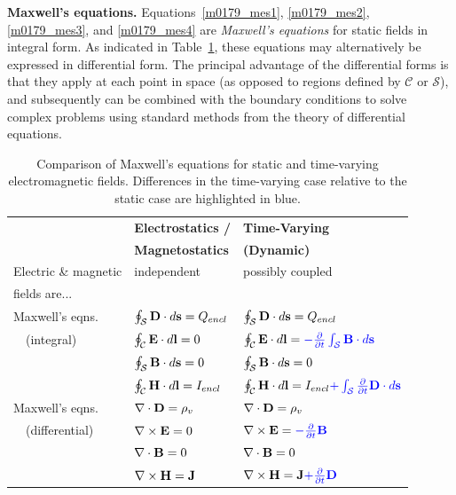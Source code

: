 {\bf Maxwell's equations.}
Equations~\ref{m0179_mes1}, \ref{m0179_mes2}, \ref{m0179_mes3}, and \ref{m0179_mes4} are \emph{Maxwell's equations} 
for static fields in integral form.
As indicated in Table~\ref{m0179_tComparison}, these equations may alternatively be expressed in differential form.
The principal advantage of the differential forms is that they apply at each point in space (as opposed to regions defined by $\mathcal{C}$ or $\mathcal{S}$), and subsequently can be combined with the boundary conditions to solve complex problems using standard methods from the theory of differential equations.
%
\begin{table}[t]
\begin{center}
\begin{tabular}{lll}
~ & {\bf Electrostatics /} & {\bf Time-Varying} \\
~ & {\bf Magnetostatics}   & {\bf (Dynamic)} \\
\hline\hline
Electric \& magnetic & independent  & {\color{blue}possibly coupled} \\
fields are...       & ~  & ~ \\
\hline
Maxwell's eqns. & $\oint_{\mathcal S}{{\bf D}\cdot d{\bf s}} = Q_{encl}$  & $\oint_{\mathcal S}{{\bf D}\cdot d{\bf s}} = Q_{encl}$ \\
~~(integral)   & $\oint_{\mathcal C}{{\bf E}\cdot d{\bf l}} = 0$         & $\oint_{\mathcal C}{{\bf E}\cdot d{\bf l}} = {\color{blue}-\frac{\partial}{\partial t}\int_{\mathcal S}{\bf B}\cdot d{\bf s}}$ \\
               & $\oint_{\mathcal S}{{\bf B}\cdot d{\bf s}} = 0$         & $\oint_{\mathcal S}{{\bf B}\cdot d{\bf s}} = 0$ \\
               & $\oint_{\mathcal C}{{\bf H}\cdot d{\bf l}} = I_{encl}$  & $\oint_{\mathcal C}{{\bf H}\cdot d{\bf l}} = I_{encl} {\color{blue} + \int_{\mathcal S}\frac{\partial}{\partial t}{\bf D}\cdot d{\bf s}}$ \\
\hline
Maxwell's eqns.     & $\nabla\cdot{\bf D}=\rho_v$   & $\nabla\cdot{\bf D}=\rho_v$ \\
~~(differential)   & $\nabla\times{\bf E}=0$       & $\nabla\times{\bf E}={\color{blue}-\frac{\partial}{\partial t}{\bf B}}$ \\
                   & $\nabla\cdot{\bf B}=0$        & $\nabla\cdot{\bf B}=0$ \\
                   & $\nabla\times{\bf H}={\bf J}$ & $\nabla\times{\bf H}={\bf J} {\color{blue}+ \frac{\partial}{\partial t}{\bf D}}$ \\
\hline
\end{tabular}
\end{center}
\caption{\label{m0179_tComparison}Comparison of Maxwell's equations for static and time-varying electromagnetic fields.  Differences in the time-varying case relative to the static case are highlighted in {\color{blue}blue}.
}
\end{table}

